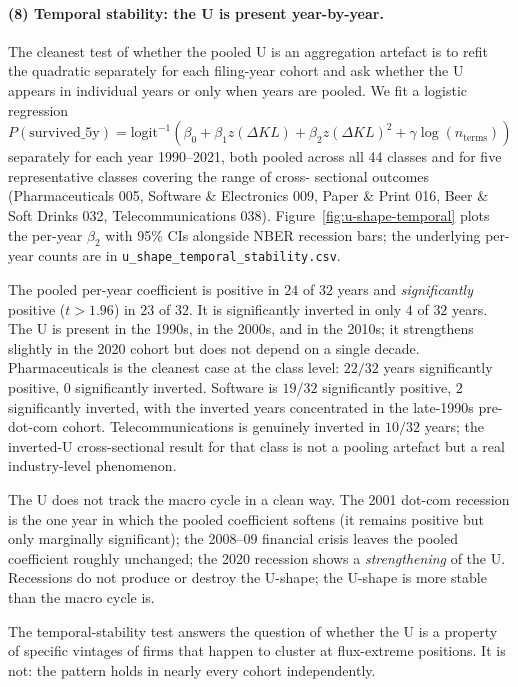 \documentclass[11pt]{article}
\begin{document}
\paragraph{(8) Temporal stability: the U is present year-by-year.}
The cleanest test of whether the pooled U is an aggregation artefact
is to refit the quadratic separately for each filing-year cohort and
ask whether the U appears in individual years or only when years
are pooled. We fit a logistic regression
$P(\text{survived\_5y}) = \mathrm{logit}^{-1}(\beta_0 + \beta_1
z(\Delta KL) + \beta_2 z(\Delta KL)^2 + \gamma \log(n_\text{terms}))$
separately for each year 1990--2021, both pooled across all 44 classes
and for five representative classes covering the range of cross-
sectional outcomes (Pharmaceuticals 005, Software \& Electronics 009,
Paper \& Print 016, Beer \& Soft Drinks 032, Telecommunications 038).
Figure~\ref{fig:u-shape-temporal} plots the per-year $\beta_2$ with
95\% CIs alongside NBER recession bars; the underlying per-year
counts are in \texttt{u\_shape\_temporal\_stability.csv}.

The pooled per-year coefficient is positive in $24$ of $32$ years and
\emph{significantly} positive ($t > 1.96$) in $23$ of $32$. It is
significantly inverted in only $4$ of $32$ years. The U is present in
the 1990s, in the 2000s, and in the 2010s; it strengthens slightly in
the 2020 cohort but does not depend on a single decade. Pharmaceuticals
is the cleanest case at the class level: $22 / 32$ years
significantly positive, $0$ significantly inverted. Software is
$19 / 32$ significantly positive, $2$ significantly inverted, with the
inverted years concentrated in the late-1990s pre-dot-com cohort.
Telecommunications is genuinely inverted in $10 / 32$ years; the
inverted-U cross-sectional result for that class is not a pooling
artefact but a real industry-level phenomenon.

The U does not track the macro cycle in a clean way. The 2001
dot-com recession is the one year in which the pooled coefficient
softens (it remains positive but only marginally significant); the
2008--09 financial crisis leaves the pooled coefficient roughly
unchanged; the 2020 recession shows a \emph{strengthening} of the
U. Recessions do not produce or destroy the U-shape; the U-shape
is more stable than the macro cycle is.

The temporal-stability test answers the question of whether the U is
a property of specific vintages of firms that happen to cluster at
flux-extreme positions. It is not: the pattern holds in nearly every
cohort independently.
\end{document}
